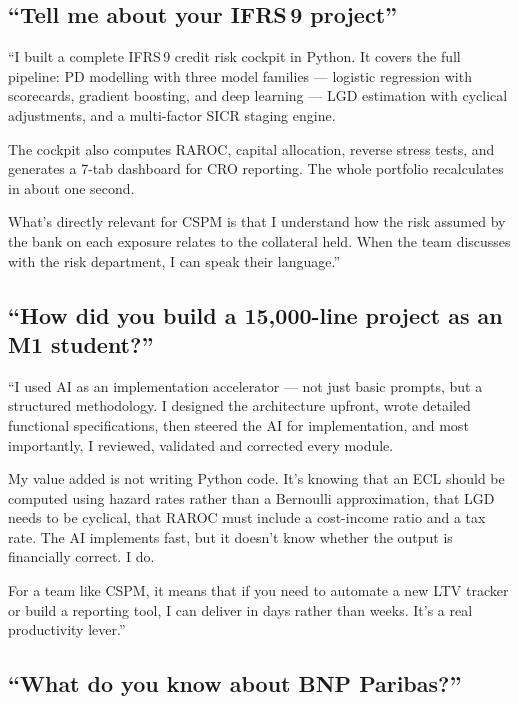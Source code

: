 \documentclass[11pt,a4paper]{article}
\begin{document}
\subsection{``Tell me about your IFRS\,9 project''}

\begin{verbatimbox}
``I built a complete IFRS\,9 credit risk cockpit in Python. It covers the
full pipeline: PD modelling with three model families --- logistic regression
with scorecards, gradient boosting, and deep learning --- LGD estimation
with cyclical adjustments, and a multi-factor SICR staging engine.

The cockpit also computes RAROC, capital allocation, reverse stress tests,
and generates a 7-tab dashboard for CRO reporting. The whole portfolio
recalculates in about one second.

What's directly relevant for CSPM is that I understand how the risk
assumed by the bank on each exposure relates to the collateral held.
When the team discusses with the risk department, I can speak their
language.''
\end{verbatimbox}

\subsection{``How did you build a 15,000-line project as an M1 student?''}

\begin{verbatimbox}
``I used AI as an implementation accelerator --- not just basic prompts,
but a structured methodology. I designed the architecture upfront, wrote
detailed functional specifications, then steered the AI for implementation,
and most importantly, I reviewed, validated and corrected every module.

My value added is not writing Python code. It's knowing that an ECL should
be computed using hazard rates rather than a Bernoulli approximation, that
LGD needs to be cyclical, that RAROC must include a cost-income ratio and
a tax rate. The AI implements fast, but it doesn't know whether the output
is financially correct. I do.

For a team like CSPM, it means that if you need to automate a new LTV
tracker or build a reporting tool, I can deliver in days rather than weeks.
It's a real productivity lever.''
\end{verbatimbox}

\subsection{``What do you know about BNP Paribas?''}
\end{document}
